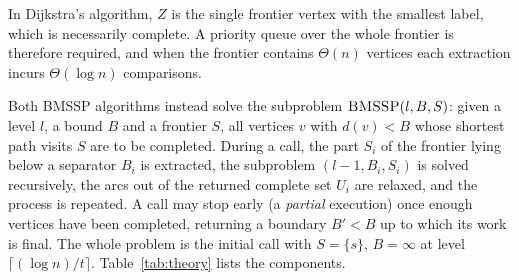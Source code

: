 \documentclass[conference,a4paper]{IEEEtran}
\newcommand{\Bp}{B'}
\begin{document}
In Dijkstra's algorithm, $Z$ is the single frontier vertex with the smallest label, which is
necessarily complete. A priority queue over the whole frontier is therefore required, and when
the frontier contains $\Theta(n)$ vertices each extraction incurs $\Theta(\log n)$ comparisons.

Both BMSSP algorithms instead solve the subproblem $\textsc{BMSSP}(l,B,S)$: given a level $l$, a
bound $B$ and a frontier $S$, all vertices $v$ with $d(v)<B$ whose shortest path visits $S$ are to
be completed. During a call, the part $S_i$ of the frontier lying below a separator $B_i$ is
extracted, the subproblem $(l-1,B_i,S_i)$ is solved recursively, the arcs out of the returned
complete set $U_i$ are relaxed, and the process is repeated. A call may stop early (a
\emph{partial} execution) once enough vertices have been completed, returning a boundary $\Bp<B$
up to which its work is final. The whole problem is the initial call with $S=\{s\}$, $B=\infty$ at
level $\lceil(\log n)/t\rceil$. Table~\ref{tab:theory} lists the components.
\end{document}
